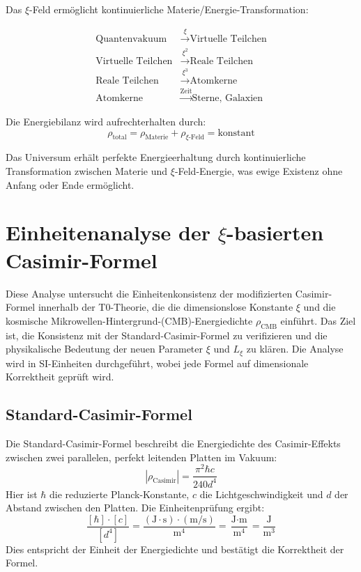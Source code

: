 \documentclass[12pt,a4paper]{article}
\theoremstyle{definition}
\theoremstyle{remark}
\begin{document}
	Das $\xi$-Feld erm\"oglicht kontinuierliche Materie/Energie-Transformation:
	
	\begin{align}
		\text{Quantenvakuum} &\xrightarrow{\xi} \text{Virtuelle Teilchen} \\
		\text{Virtuelle Teilchen} &\xrightarrow{\xi^2} \text{Reale Teilchen} \\
		\text{Reale Teilchen} &\xrightarrow{\xi^3} \text{Atomkerne} \\
		\text{Atomkerne} &\xrightarrow{\text{Zeit}} \text{Sterne, Galaxien}
	\end{align}
	
	Die Energiebilanz wird aufrechterhalten durch:
	\begin{equation}
		\rho_{\text{total}} = \rho_{\text{Materie}} + \rho_{\xi\text{-Feld}} = \text{konstant}
	\end{equation}
	
	\begin{important}
		Das Universum erh\"alt perfekte Energieerhaltung durch kontinuierliche Transformation zwischen Materie und $\xi$-Feld-Energie, was ewige Existenz ohne Anfang oder Ende erm\"oglicht.
	\end{important}
	
	\section{Einheitenanalyse der $\xi$-basierten Casimir-Formel}
	
	Diese Analyse untersucht die Einheitenkonsistenz der modifizierten Casimir-Formel innerhalb der T0-Theorie, die die dimensionslose Konstante $\xi$ und die kosmische Mikrowellen-Hintergrund-(CMB)-Energiedichte $\rho_{\text{CMB}}$ einf\"uhrt. Das Ziel ist, die Konsistenz mit der Standard-Casimir-Formel zu verifizieren und die physikalische Bedeutung der neuen Parameter $\xi$ und $L_\xi$ zu kl\"aren. Die Analyse wird in SI-Einheiten durchgef\"uhrt, wobei jede Formel auf dimensionale Korrektheit gepr\"uft wird.
	
	\subsection{Standard-Casimir-Formel}
	Die Standard-Casimir-Formel beschreibt die Energiedichte des Casimir-Effekts zwischen zwei parallelen, perfekt leitenden Platten im Vakuum:
	\begin{equation}
		|\rho_{\text{Casimir}}| = \frac{\pi^2 \hbar c}{240 d^4}
	\end{equation}
	Hier ist $\hbar$ die reduzierte Planck-Konstante, $c$ die Lichtgeschwindigkeit und $d$ der Abstand zwischen den Platten. Die Einheitenpr\"ufung ergibt:
	\begin{equation}
		\frac{[\hbar] \cdot [c]}{[d^4]} = \frac{(\text{J} \cdot \text{s}) \cdot (\text{m}/\text{s})}{\text{m}^4} = \frac{\text{J} \cdot \text{m}}{\text{m}^4} = \frac{\text{J}}{\text{m}^3}
	\end{equation}
	Dies entspricht der Einheit der Energiedichte und best\"atigt die Korrektheit der Formel.
	
\end{document}
